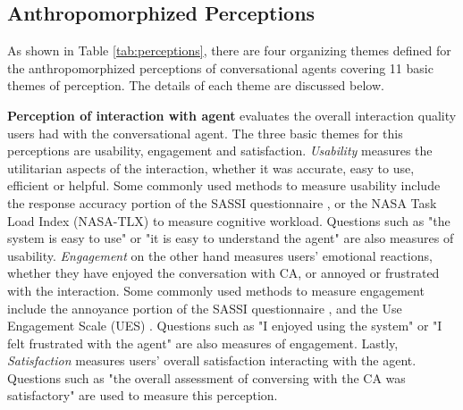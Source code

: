 \documentclass[sigconf,screen,review, anonymous]{acmart}
\newcommand{\cmt}[1]{}%
\begin{document}
\subsection{Anthropomorphized Perceptions}

As shown in Table \ref{tab:perceptions}, there are four organizing themes defined for the anthropomorphized perceptions of conversational agents covering 11 basic themes of perception. The details of each theme are discussed below.

\textbf{Perception of interaction with agent} evaluates the overall interaction quality users had with the conversational agent. The three basic themes for this perceptions are usability, engagement and satisfaction. \textit{Usability} measures the utilitarian aspects of the interaction, whether it was accurate, easy to use, efficient or helpful. Some commonly used methods to measure usability include the response accuracy portion of the SASSI questionnaire \cite{hone2000towards}\cmt{sassi}, or the NASA Task Load Index (NASA-TLX) \cite{hart1988development}\cmt{nasa} to measure cognitive workload. Questions such as "the system is easy to use" or "it is easy to understand the agent" are also measures of usability. \textit{Engagement} on the other hand measures users' emotional reactions, whether they have enjoyed the conversation with CA, or annoyed or frustrated with the interaction. Some commonly used methods to measure engagement include  the annoyance portion of the SASSI questionnaire \cite{hone2000towards}\cmt{sassi}, and the Use Engagement Scale (UES) \cite{o2018practical}\cmt{ues}. Questions such as "I enjoyed using the system" or "I felt frustrated with the agent" are also measures of engagement. Lastly, \textit{Satisfaction} measures users' overall satisfaction interacting with the agent. Questions such as "the overall assessment of conversing with the CA was satisfactory" are used to measure this perception.
\end{document}
